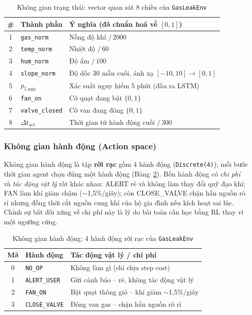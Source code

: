 \begin{table}[H]
\centering
\caption{Không gian trạng thái: vector quan sát 8 chiều của \texttt{GasLeakEnv}}
\label{tab:rl_state}
\begin{tabular}{clp{6.6cm}}
\toprule
\textbf{\#} & \textbf{Thành phần} & \textbf{Ý nghĩa (đã chuẩn hoá về $[0,1]$)} \\
\midrule
1 & \texttt{gas\_norm}      & Nồng độ khí $/\,2000$ \\
2 & \texttt{temp\_norm}     & Nhiệt độ $/\,60$ \\
3 & \texttt{hum\_norm}      & Độ ẩm $/\,100$ \\
4 & \texttt{slope\_norm}    & Độ dốc 30 mẫu cuối, ánh xạ $[-10,10]\!\to\![0,1]$ \\
5 & $p_{5\min}$             & Xác suất nguy hiểm 5 phút (đầu ra LSTM) \\
6 & \texttt{fan\_on}        & Cờ quạt đang bật $\{0,1\}$ \\
7 & \texttt{valve\_closed}  & Cờ van đang đóng $\{0,1\}$ \\
8 & $\Delta t_{\mathrm{act}}$ & Thời gian từ hành động cuối $/\,300$ \\
\bottomrule
\end{tabular}
\end{table}

\subsubsection{Không gian hành động (Action space)}

Không gian hành động là tập \textbf{rời rạc} gồm 4 hành động (\texttt{Discrete(4)}); mỗi bước thời gian agent chọn đúng một hành động (Bảng~\ref{tab:rl_action}). Bốn hành động có \emph{chi phí} và \emph{tác động vật lý} rất khác nhau: ALERT rẻ và không làm thay đổi quỹ đạo khí; FAN làm khí giảm chậm ($\sim$1,5\%/giây); còn CLOSE\_VALVE chặn hẳn nguồn rò rỉ nhưng đồng thời cắt nguồn cung khí của hộ gia đình nếu kích hoạt sai lúc. Chính sự bất đối xứng về chi phí này là lý do bài toán cần học bằng RL thay vì một ngưỡng cứng.

\begin{table}[H]
\centering
\caption{Không gian hành động: 4 hành động rời rạc của \texttt{GasLeakEnv}}
\label{tab:rl_action}
\begin{tabular}{cll}
\toprule
\textbf{Mã} & \textbf{Hành động} & \textbf{Tác động vật lý / chi phí} \\
\midrule
0 & \texttt{NO\_OP}       & Không làm gì (chỉ chịu step cost) \\
1 & \texttt{ALERT\_USER} & Gửi cảnh báo -- rẻ, không tác động vật lý \\
2 & \texttt{FAN\_ON}     & Bật quạt thông gió -- khí giảm $\sim$1,5\%/giây \\
3 & \texttt{CLOSE\_VALVE}& Đóng van gas -- chặn hẳn nguồn rò rỉ \\
\bottomrule
\end{tabular}
\end{table}

